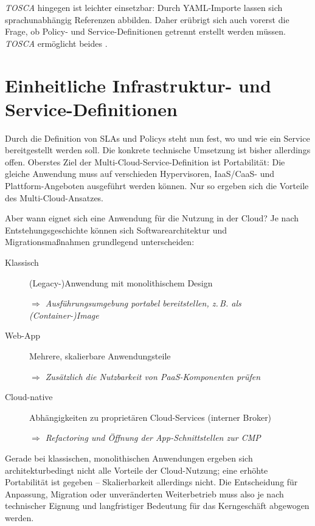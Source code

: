 \emph{TOSCA} hingegen ist leichter einsetzbar: Durch YAML-Importe lassen sich sprachunabhängig Referenzen abbilden. Daher erübrigt sich auch vorerst die Frage, ob Policy- und Service-Definitionen getrennt erstellt werden müssen. \emph{TOSCA} ermöglicht beides \cite{borgi:2014:tosca-intro}.

\section{Einheitliche Infrastruktur- und Service-Definitionen}%
\label{sec:service-definition}

Durch die Definition von SLAs und Policys steht nun fest, wo und wie ein Service bereitgestellt werden soll. Die konkrete technische Umsetzung ist bisher allerdings offen. Oberstes Ziel der Multi-Cloud-Service-Definition ist Portabilität: Die gleiche Anwendung muss auf verschieden Hypervisoren, IaaS/CaaS- und Plattform-Angeboten ausgeführt werden können. Nur so ergeben sich die Vorteile des Multi-Cloud-Ansatzes.

Aber wann eignet sich eine Anwendung für die Nutzung in der Cloud? Je nach Entstehungsgeschichte können sich Softwarearchitektur und Migrationsmaßnahmen grundlegend unterscheiden:

\begin{description}
	
	\item[Klassisch] (Legacy-)Anwendung mit monolithischem Design
	
	\emph{$\Rightarrow$ Ausführungsumgebung portabel bereitstellen, z.\,B. als (Container-)Image}
	
	\item[Web-App] Mehrere, skalierbare Anwendungsteile
	
	\emph{$\Rightarrow$ Zusätzlich die Nutzbarkeit von PaaS-Komponenten prüfen}
	
	\item[Cloud-native] Abhängigkeiten zu proprietären Cloud-Services (interner Broker)
	
	\emph{$\Rightarrow$ Refactoring und Öffnung der App-Schnittstellen zur CMP}
	
\end{description}

\noindent
Gerade bei klassischen, monolithischen Anwendungen ergeben sich architekturbedingt nicht alle Vorteile der Cloud-Nutzung; eine erhöhte Portabilität ist gegeben --  Skalierbarkeit allerdings nicht. Die Entscheidung für Anpassung, Migration oder unveränderten Weiterbetrieb muss also je nach technischer Eignung und langfristiger Bedeutung für das Kerngeschäft abgewogen werden.

